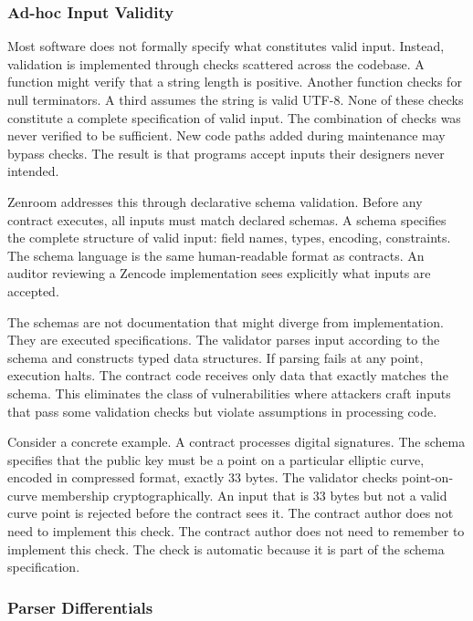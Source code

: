 \subsubsection{Ad-hoc Input Validity}

Most software does not formally specify what constitutes valid
input. Instead, validation is implemented through checks scattered
across the codebase. A function might verify that a string length is
positive. Another function checks for null terminators. A third
assumes the string is valid UTF-8. None of these checks constitute a
complete specification of valid input. The combination of checks was
never verified to be sufficient. New code paths added during
maintenance may bypass checks. The result is that programs accept
inputs their designers never intended.

Zenroom addresses this through declarative schema validation. Before
any contract executes, all inputs must match declared schemas. A
schema specifies the complete structure of valid input: field names,
types, encoding, constraints. The schema language is the same
human-readable format as contracts. An auditor reviewing a Zencode
implementation sees explicitly what inputs are accepted.

The schemas are not documentation that might diverge from
implementation. They are executed specifications. The validator parses
input according to the schema and constructs typed data structures. If
parsing fails at any point, execution halts. The contract code
receives only data that exactly matches the schema. This eliminates
the class of vulnerabilities where attackers craft inputs that pass
some validation checks but violate assumptions in processing code.

Consider a concrete example. A contract processes digital
signatures. The schema specifies that the public key must be a point
on a particular elliptic curve, encoded in compressed format, exactly
33 bytes. The validator checks point-on-curve membership
cryptographically. An input that is 33 bytes but not a valid curve
point is rejected before the contract sees it. The contract author
does not need to implement this check. The contract author does not
need to remember to implement this check. The check is automatic
because it is part of the schema specification.

\subsubsection{Parser Differentials}

